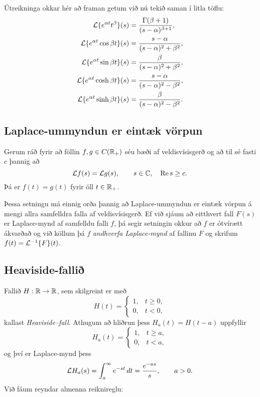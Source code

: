 Útreikninga okkar hér að framan getum við  nú  tekið saman í litla
töflu: 
\begin{align*}
{\cal L}{\{e^{\alpha t}t^{\beta}\}}(s)
&=\dfrac{\Gamma(\beta+1)}{(s-\alpha)^{\beta+1}},\\
{\cal L}{\{e^{\alpha t}\cos \beta t\}}(s)
&=\dfrac{s-\alpha}{(s-\alpha)^2+\beta^2},\\
{\cal L}{\{e^{\alpha t}\sin \beta t\}}(s)
&=\dfrac{\beta}{(s-\alpha)^2+\beta^2},\\
{\cal L}{\{e^{\alpha t}\cosh \beta t\}}(s)
&=\dfrac{s-\alpha}{(s-\alpha)^2-\beta^2},\\
{\cal L}{\{e^{\alpha t}\sinh \beta t\}}(s)
&=\dfrac{\beta}{(s-\alpha)^2-\beta^2}.
\end{align*}


\subsection*{Laplace-ummyndun er eintæk vörpun}


\begin{se}\label{set:10.1.2}
Gerum ráð fyrir að föllin $f,g\in C({\mathbb R}_+)$ séu bæði af
veldisvísisgerð og að til sé fasti $c$ þannig að 
 $${\cal L} f(s)={\cal L} g(s), \qquad s\in {\mathbb C}, \quad {\operatorname{Re\, }} s\geq c.
 $$
Þá er $f(t)=g(t)$ fyrir öll $t\in {\mathbb R}_+$. 
\end{se}


Þessa setningu má einnig orða þannig að Laplace-ummyndun er eintæk
vörpun á mengi allra samfelldra falla af veldisvísisgerð.  
Ef við sjáum að eitthvert fall $F(s)$ er Laplace-mynd af samfelldu 
falli $f$, 
þá segir setningin okkur að $f$ er ótvírætt ákvarðað og við köllum þá
$f$ {\it andhverfa Laplace-mynd } af fallinu $F$ og skrifum
$f(t)={\cal L}^{-1}\{F\}(t)$.


\subsection*{Heaviside-fallið}

Fallið $H:{\mathbb R}\to {\mathbb R}$, sem skilgreint er með
\begin{equation*}
H(t)=\begin{cases} 1, &t\geq 0,\\ 0, & t<0,\end{cases}\label{7.1.5}
\end{equation*}
kallast {\it Heaviside--fall}.  Athugum að
hliðrun þess $H_a(t)=H(t-a)$ uppfyllir
\begin{equation*}
H_a(t)=\begin{cases} 1, &t\geq a,\\ 0, & t<a,\end{cases}\label{7.1.6}
\end{equation*}
og því er Laplace-mynd þess
\begin{equation*}
{\cal L} H_a(s)= \int_a^{\infty} e^{-st}\, dt= \dfrac{e^{-as}} s, \qquad a>0.
\label{7.1.7}
\end{equation*}
Við fáum reyndar almenna reiknireglu:

